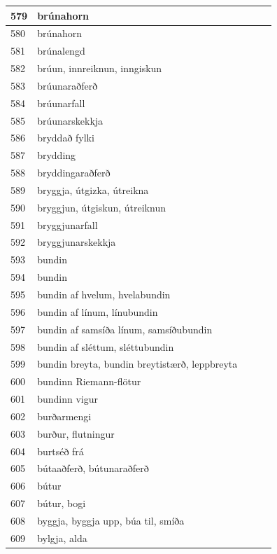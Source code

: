\begin{longtable}{p{}|p{}|p{}|p{}|p{}}
\hline
579 & brúnahorn &  &  &  \\
\hline
580 & brúnahorn &  &  &  \\
\hline
581 & brúnalengd &  &  &  \\
\hline
582 & brúun, innreiknun, inngiskun &  &  &  \\
\hline
583 & brúunaraðferð &  &  &  \\
\hline
584 & brúunarfall &  &  &  \\
\hline
585 & brúunarskekkja &  &  &  \\
\hline
586 & bryddað fylki &  &  &  \\
\hline
587 & brydding &  &  &  \\
\hline
588 & bryddingaraðferð &  &  &  \\
\hline
589 & bryggja, útgizka, útreikna &  &  &  \\
\hline
590 & bryggjun, útgiskun, útreiknun &  &  &  \\
\hline
591 & bryggjunarfall &  &  &  \\
\hline
592 & bryggjunarskekkja &  &  &  \\
\hline
593 & bundin &  &  &  \\
\hline
594 & bundin &  &  &  \\
\hline
595 & bundin af hvelum, hvelabundin &  &  &  \\
\hline
596 & bundin af línum, línubundin &  &  &  \\
\hline
597 & bundin af samsíða línum, samsíðubundin &  &  &  \\
\hline
598 & bundin af sléttum, sléttubundin &  &  &  \\
\hline
599 & bundin breyta, bundin breytistærð, leppbreyta &  &  &  \\
\hline
600 & bundinn Riemann-flötur &  &  &  \\
\hline
601 & bundinn vigur &  &  &  \\
\hline
602 & burðarmengi &  &  &  \\
\hline
603 & burður, flutningur &  &  &  \\
\hline
604 & burtséð frá &  &  &  \\
\hline
605 & bútaaðferð, bútunaraðferð &  &  &  \\
\hline
606 & bútur &  &  &  \\
\hline
607 & bútur, bogi &  &  &  \\
\hline
608 & byggja, byggja upp, búa til, smíða &  &  &  \\
\hline
609 & bylgja, alda &  &  &  \\

\end{longtable}
